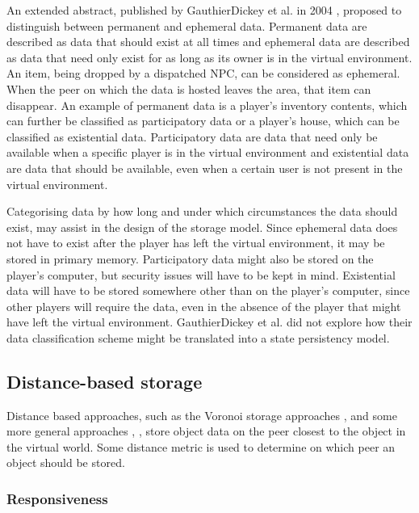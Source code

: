 An extended abstract, published by GauthierDickey et al. in 2004 \cite{hybrid_storage1}, proposed to distinguish between permanent and ephemeral data. Permanent data are described as data that should exist at all times and ephemeral data are described as data that need only exist for as long as its owner is in the virtual environment. An item, being dropped by a dispatched NPC, can be considered as ephemeral. When the peer on which the data is hosted leaves the area, that item can disappear. An example of permanent data is a player's inventory contents, which can further be classified as participatory data or a player's house, which can be classified as existential data. Participatory data are data that need only be available when a specific player is in the virtual environment and existential data are data that should be available, even when a certain user is not present in the virtual environment.

Categorising data by how long and under which circumstances the data should exist, may assist in the design of the storage model. Since ephemeral data does not have to exist after the player has left the virtual environment, it may be stored in primary memory. Participatory data might also be stored on the player's computer, but security issues will have to be kept in mind. Existential data will have to be stored somewhere other than on the player's computer, since other players will require the data, even in the absence of the player that might have left the virtual environment. GauthierDickey et al. did not explore how their data classification scheme might be translated into a state persistency model.

\subsection{Distance-based storage}
\label{distance_based_storage}

Distance based approaches, such as the Voronoi storage approaches \cite{Buyukkaya_voronoi_state_management}, \cite{Hu_voronoi_IM} and some more general approaches \cite{colyseus_distance_based}, \cite{solipsis}, store object data on the peer closest to the object in the virtual world. Some distance metric is used to determine on which peer an object should be stored.

\subsubsection{Responsiveness}

